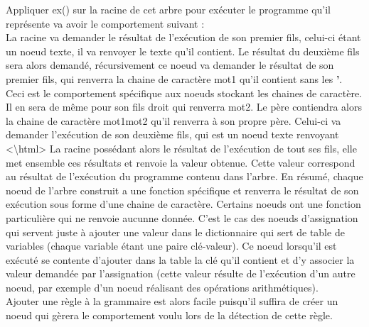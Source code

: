 \documentclass[a4paper,10pt]{article}
\begin{document}
Appliquer \textrm{ex()} sur la racine de cet arbre pour exécuter le programme qu'il représente va avoir le comportement suivant : \\
La racine va demander le résultat de l'exécution de son premier fils, celui-ci étant un noeud texte, il va renvoyer le texte qu'il contient. Le résultat du deuxième fils sera alors
demandé, récursivement ce noeud va demander le résultat de son premier fils, qui renverra la chaine de caractère \textrm{mot1} qu'il contient sans les \textbf{'}. Ceci est le comportement
spécifique aux noeuds stockant les chaines de caractère. Il en sera de même pour son fils droit qui renverra \textrm{mot2}. Le père contiendra alors la chaine de
caractère \textrm{mot1mot2} qu'il renverra à son propre père. Celui-ci va demander l'exécution de son deuxième fils, qui est un noeud texte renvoyant \textrm{<\textbackslash html>}
La racine possédant alors le résultat de l'exécution de tout ses fils, elle met ensemble ces résultats et renvoie la valeur obtenue. Cette valeur correspond au résultat de 
l'exécution du programme contenu dans l'arbre. En résumé, chaque noeud de l'arbre construit a une fonction spécifique et renverra le résultat de son exécution sous forme d'une chaine de caractère.
Certains noeuds ont une fonction particulière qui ne renvoie aucunne donnée. C'est le cas des noeuds d'assignation qui servent juste à ajouter une valeur dans le dictionnaire qui sert de 
table de variables (chaque variable étant une paire clé-valeur). Ce noeud lorsqu'il est exécuté se contente d'ajouter dans la table la clé qu'il contient et d'y associer la valeur demandée
par l'assignation (cette valeur résulte de l'exécution d'un autre noeud, par exemple d'un noeud réalisant des opérations arithmétiques). \\
Ajouter une règle à la grammaire est alors facile puisqu'il suffira de créer un noeud qui gèrera le comportement voulu lors de la détection de cette règle. 
\end{document}
